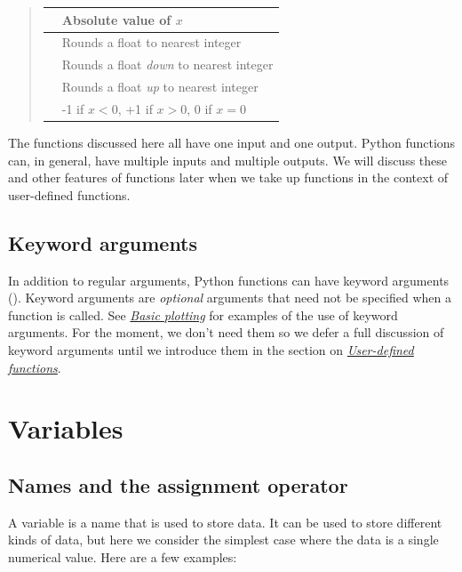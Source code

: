\documentclass[letterpaper,10pt,english]{sphinxmanual}
\begin{document}
\begin{quote}
\begin{tabulary}{\linewidth}{|L|L|}
 & 
Absolute value of $x$
\\\hline

 & 
Rounds a float to nearest integer
\\\hline

 & 
Rounds a float \emph{down} to nearest integer
\\\hline

 & 
Rounds a float \emph{up} to nearest integer
\\\hline

 & 
-1 if $x<0$, +1 if $x>0$, 0 if $x=0$
\\\hline
\end{tabulary}

\end{quote}

The functions discussed here all have one input and one output.  Python functions can, in general, have multiple inputs and multiple outputs.  We will discuss these and other features of functions later when we take up functions in the context of user-defined functions.


\subsection{Keyword arguments}
\label{chap2/chap2_basics:keyword-arguments}
In addition to regular arguments, Python functions can have keyword arguments ().  Keyword arguments are \emph{optional} arguments that need not be specified when a function is called.  See {\hyperref[chap5/chap5_plot:chap5basicplotting]{\emph{Basic plotting}}} for examples of the use of keyword arguments.  For the moment, we don't need them so we defer a full discussion of keyword arguments until we introduce them in the section on {\hyperref[chap7/chap7_funcs:userdefdfuncs]{\emph{User-defined functions}}}.


\section{Variables}
\label{chap2/chap2_basics:variables}

\subsection{Names and the assignment operator}
\label{chap2/chap2_basics:names-and-the-assignment-operator}
A variable is a name that is used to store data.  It can be used to store different kinds of data, but here we consider the simplest case where the data is a single numerical value.  Here are a few examples:
\end{document}
